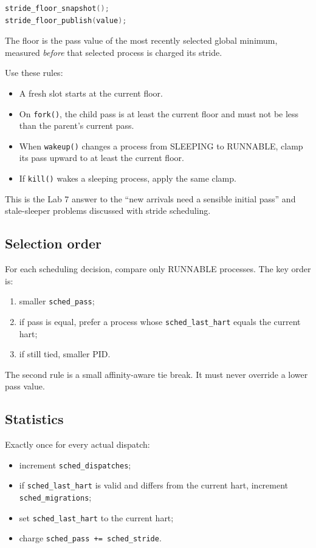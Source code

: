 \documentclass[11pt,a4paper]{article}
\newcommand{\file}[1]{\texttt{#1}}
\begin{document}
\begin{lstlisting}[language=C]
stride_floor_snapshot();
stride_floor_publish(value);
\end{lstlisting}

The floor is the pass value of the most recently selected global minimum, measured \emph{before} that selected process is charged its stride.

Use these rules:

\begin{itemize}
\item A fresh slot starts at the current floor.
\item On \file{fork()}, the child pass is at least the current floor and must not be less than the parent's current pass.
\item When \file{wakeup()} changes a process from SLEEPING to RUNNABLE, clamp its pass upward to at least the current floor.
\item If \file{kill()} wakes a sleeping process, apply the same clamp.
\end{itemize}

This is the Lab 7 answer to the ``new arrivals need a sensible initial pass'' and stale-sleeper problems discussed with stride scheduling.

\subsection{Selection order}

For each scheduling decision, compare only RUNNABLE processes. The key order is:

\begin{enumerate}
\item smaller \file{sched\_pass};
\item if pass is equal, prefer a process whose \file{sched\_last\_hart} equals the current hart;
\item if still tied, smaller PID.
\end{enumerate}

The second rule is a small affinity-aware tie break. It must never override a lower pass value.

\subsection{Statistics}

Exactly once for every actual dispatch:

\begin{itemize}
\item increment \file{sched\_dispatches};
\item if \file{sched\_last\_hart} is valid and differs from the current hart, increment \file{sched\_migrations};
\item set \file{sched\_last\_hart} to the current hart;
\item charge \file{sched\_pass += sched\_stride}.
\end{itemize}
\end{document}

